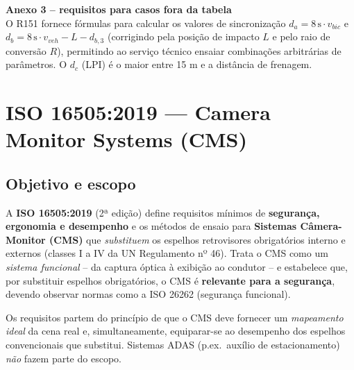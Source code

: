 \documentclass[11pt,a4paper]{article}
\newcommand{\destaque}[2]{%
  \begin{center}
  \begin{minipage}{0.96\linewidth}
  \colorbox{azulclaro}{\parbox{\dimexpr\linewidth-2\fboxsep}{%
  \textbf{\textcolor{azulun}{#1}}\\[2pt]\small #2}}
  \end{minipage}
  \end{center}}
\begin{document}
\destaque{Anexo 3 -- requisitos para casos fora da tabela}{O R151 fornece
fórmulas para calcular os valores de sincronização $d_a = 8\,\mathrm{s}\cdot
v_{bic}$ e $d_b = 8\,\mathrm{s}\cdot v_{veh} - L - d_{b,3}$ (corrigindo pela
posição de impacto $L$ e pelo raio de conversão $R$), permitindo ao serviço
técnico ensaiar combinações arbitrárias de parâmetros. O $d_c$ (LPI) é o maior
entre 15 m e a distância de frenagem.}

\clearpage
\section{ISO 16505:2019 --- Camera Monitor Systems (CMS)}

\subsection{Objetivo e escopo}

A \textbf{ISO 16505:2019} (2ª edição) define requisitos mínimos de
\textbf{segurança, ergonomia e desempenho} e os métodos de ensaio para
\textbf{Sistemas Câmera-Monitor (CMS)} que \emph{substituem} os espelhos
retrovisores obrigatórios interno e externos (classes I a IV da UN Regulamento
nº 46). Trata o CMS como um \emph{sistema funcional} -- da captura óptica à
exibição ao condutor -- e estabelece que, por substituir espelhos obrigatórios,
o CMS é \textbf{relevante para a segurança}, devendo observar normas como a
ISO 26262 (segurança funcional).

Os requisitos partem do princípio de que o CMS deve fornecer um
\emph{mapeamento ideal} da cena real e, simultaneamente, equiparar-se ao
desempenho dos espelhos convencionais que substitui. Sistemas ADAS (p.ex.\
auxílio de estacionamento) \emph{não} fazem parte do escopo.
\end{document}
